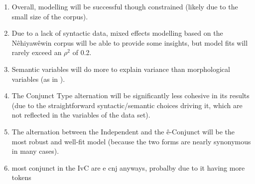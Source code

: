 \begin{enumerate}
    \item Overall, modelling will be successful though constrained (likely due to the small size of the corpus).
    \item Due to a lack of syntactic data, mixed effects modelling based on the Nêhiyawêwin corpus will be able to provide some insights, but model fits will rarely exceed an $\rho^{2}$ of 0.2.
    \item Semantic variables will do more to explain variance than morphological variables (as in \citep{arppe2008univariate}).
    \item The Conjunct Type alternation will be significantly less cohesive in its results (due to the straightforward syntactic/semantic choices driving it, which are not reflected in the variables of the data set).
    \item The alternation between the Independent and the ê-Conjunct will be the most robust and well-fit model (because the two forms are nearly synonymous in many cases).
    \item most conjunct in the IvC are e cnj anyways, probalby due to it having more tokens
\end{enumerate}